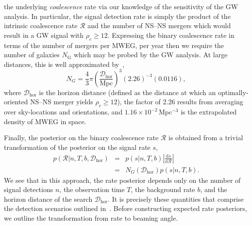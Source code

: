 \documentclass[twocolumn]{aastex61}
\newcommand{\cbcrate}{{{\mathcal R}}}
\newcommand{\diff}{{\mathrm d}}
\newcommand{\dhor}{\ensuremath{{\mathcal D}_{\mathrm{hor}}}}
\newcommand{\mpc}{\mathrm{Mpc}}
\newcommand{\BNS}{\ac{NS}--\ac{NS}\xspace}
\begin{document}
the underlying \emph{coalescence} rate via our knowledge of the
sensitivity of the \ac{GW} analysis.  In particular, the signal
detection rate is simply the product of the intrinsic coalescence rate
$\cbcrate$ and the number of \BNS mergers which would result in a
\ac{GW} signal with $\rho_c\geq12$.  Expressing the binary coalescence
rate in terms of the number of mergers per \ac{MWEG}, per year then we
require the number of galaxies $N_{\mathrm{G}}$ which may be probed by
the \ac{GW} analysis.  At large distances, this is well approximated
by~\cite{rates_paper},
%
\begin{equation}
    N_G = \frac{4}{3} \pi \left( \frac{\dhor}{\mpc}
\right)^3 (2.26)^{-3} (0.0116),
\end{equation}
%
where $\dhor$ is the horizon distance (defined as the distance at which an
optimally-oriented \BNS merger yields $\rho_c\geq12$), the factor of 2.26
results from averaging over sky-locations and orientations, and
$1.16\times 10^{-2}$\,Mpc$^{-3}$ is the extrapolated density of \ac{MWEG} in
space.

Finally, the posterior on the binary coalescence rate $\cbcrate$ is obtained from a trivial transformation of the posterior on the signal rate $s$,
%
\begin{eqnarray}
    p(\cbcrate|n,T,b,\dhor) & = & p(s|n,T,b) \left|\frac{\diff s}{\diff \cbcrate}\right| \\
                                   & = & N_G(\dhor)p(s|n,T,b).
\end{eqnarray}
%
We see that in this approach, the rate posterior depends only on the
number of signal detections $n$, the observation time $T$, the
background rate $b$, and the horizon distance of the search $\dhor$.
It is precisely these quantities that comprise the detection scenarios
outlined in~\cite{Aasi:2013wya}.  Before constructing expected rate
posteriors, we outline the transformation from rate to beaming angle.
\end{document}
